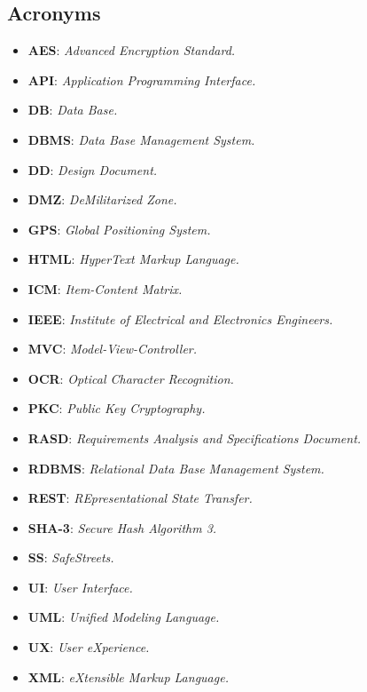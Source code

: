 \documentclass[12pt,a4paper]{report}
\begin{document}
			\subsection{Acronyms}
				\begin{itemize}
				\item \textbf{AES}: \emph{Advanced Encryption Standard.}
				\item \textbf{API}: \emph{Application Programming Interface.}
				\item \textbf{DB}: \emph{Data Base.}			
				\item \textbf{DBMS}: \emph{Data Base Management System.}
				\item \textbf{DD}: \emph{Design Document.}
				\item \textbf{DMZ}: \emph{DeMilitarized Zone.}
				\item \textbf{GPS}: \emph{Global Positioning System.}
				\item \textbf{HTML}: \emph{HyperText Markup Language.}
				\item \textbf{ICM}: \emph{Item-Content Matrix.}
				\item \textbf{IEEE}: \emph{Institute of Electrical and Electronics Engineers.}
				\item \textbf{MVC}: \emph{Model-View-Controller.}
				\item \textbf{OCR}: \emph{Optical Character Recognition.}
				\item \textbf{PKC}: \emph{Public Key Cryptography.}
				\item \textbf{RASD}: \emph{Requirements Analysis and Specifications Document.}
				\item \textbf{RDBMS}: \emph{Relational Data Base Management System.}
				\item \textbf{REST}: \emph{REpresentational State Transfer.}
				\item \textbf{SHA-3}: \emph{Secure Hash Algorithm 3.}	
				\item \textbf{SS}: \emph{SafeStreets.}	
				\item \textbf{UI}: \emph{User Interface.}
				\item \textbf{UML}: \emph{Unified Modeling Language.}
				\item \textbf{UX}: \emph{User eXperience.}
				\item \textbf{XML}: \emph{eXtensible Markup Language.}
				\end{itemize}
\end{document}
